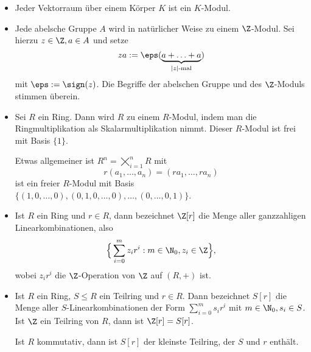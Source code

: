 \begin{ex*}
	\begin{itemize}
		\item
			Jeder Vektorraum über einem Körper $K$ ist ein $K$-Modul.
		\item
			Jede abelsche Gruppe $A$ wird in natürlicher Weise zu einem $\Z$-Modul.
			Sei hierzu $z \in \Z, a \in A$ und setze
			\[
				za := \eps(\underbrace{a + \dotsc + a}_{|z|\text{-mal}})
			\]
			mit $\eps := \sign(z)$.
			Die Begriffe der abelschen Gruppe und des $\Z$-Moduls stimmen überein.
		\item
			Sei $R$ ein Ring.
			Dann wird $R$ zu einem $R$-Modul, indem man die Ringmultiplikation als Skalarmultiplikation nimmt.
			Dieser $R$-Modul ist frei mit Basis $\{1\}$.

			Etwas allgemeiner ist $R^n = \bigtimes_{i=1}^n R$ mit
			\[
				r(a_1, \dotsc, a_n) = (ra_1, \dotsc, ra_n)
			\]
			ist ein freier $R$-Modul mit Basis $\{ (1, 0, \dotsc, 0), (0, 1, 0, \dotsc, 0), \dotsc, (0, \dotsc, 0, 1) \}$.
		\item
			Ist $R$ ein Ring und $r \in R$, dann bezeichnet $\Z[r]$ die Menge aller ganzzahligen Linearkombinationen, also
			\[
				\Big\{ \sum_{i=0}^m z_i r^i : m\in \N_0, z_i \in \Z \Big\},
			\]
			wobei $z_i r^i$ die $\Z$-Operation von $\Z$ auf $(R, +)$ ist.
		\item
			Ist $R$ ein Ring, $S \le R$ ein Teilring und $r \in R$.
			Dann bezeichnet $S[r]$ die Menge aller $S$-Linearkombinationen der Form $\sum_{i=0}^m s_i r^i$ mit $m \in \N_0, s_i \in S$.
			Ist $\Z$ ein Teilring von $R$, dann ist $\Z[r] = S[r]$.

			Ist $R$ kommutativ, dann ist $S[r]$ der kleinste Teilring, der $S$ und $r$ enthält.
	\end{itemize}
\end{ex*}

